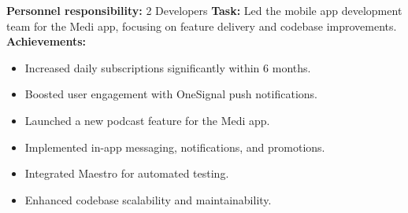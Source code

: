 \documentclass[10pt,a4paper,normalphoto]{altacv}
\begin{document}








\begin{fullwidth}
\makecvheader
\end{fullwidth}



\textbf{Personnel responsibility:} 2 Developers
\textbf{Task:} Led the mobile app development team for the Medi app, focusing on feature delivery and codebase improvements.\\
\textbf{Achievements:}
\begin{itemize}
    \item Increased daily subscriptions significantly within 6 months.
    \item Boosted user engagement with OneSignal push notifications.
    \item Launched a new podcast feature for the Medi app.
    \item Implemented in-app messaging, notifications, and promotions.
    \item Integrated Maestro for automated testing.
    \item Enhanced codebase scalability and maintainability.
\end{itemize}
\end{document}
